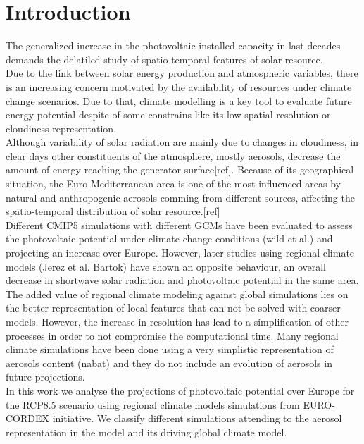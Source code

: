 \section{Introduction}

    The generalized increase in the photovoltaic installed capacity in last decades demands the delatiled study of spatio-temporal features of solar resource.\\

  Due to the link between solar energy production and atmospheric variables, there is an increasing concern motivated by the availability of resources under climate change scenarios. Due to that, climate modelling is a key tool to evaluate future energy potential despite of some constrains like its low spatial resolution or cloudiness representation.\\
  
   Although variability of solar radiation are mainly due to changes in cloudiness, in clear days other constituents of the atmosphere, mostly aerosols, decrease the amount of energy reaching the generator surface[ref]. Because of its geographical situation, the Euro-Mediterranean area is one of the most influenced areas by natural and anthropogenic aerosols comming from different sources, affecting the spatio-temporal distribution of solar resource.[ref]\\

   Different CMIP5 simulations with different GCMs have been evaluated to assess the photovoltaic potential under climate change conditions (wild et al.) and projecting an increase over Europe. However, later studies using regional climate models (Jerez et al. Bartok) have shown an opposite behaviour, an overall decrease in shortwave solar radiation and photovoltaic potential in the same area.\\

   The added value of regional climate modeling against global simulations lies on the better representation of local features that can not be solved with coarser models. However, the increase in resolution has lead to a simplification of other processes in order to not compromise the computational time. Many regional climate simulations have been done using a very simplistic representation of aerosols content (nabat) and they do not include an evolution of aerosols in future projections.\\
   
   In this work we analyse the projections of photovoltaic potential over Europe for the RCP8.5 scenario using regional climate models simulations from EURO-CORDEX initiative. We classify different simulations attending to the aerosol representation in the model and its driving global climate model.\\


